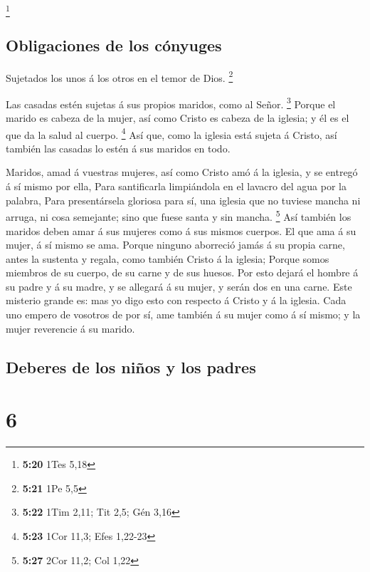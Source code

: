 \footnote{\textbf{5:20} 1Tes 5,18}

\hypertarget{obligaciones-de-los-cuxf3nyuges}{%
\subsection{Obligaciones de los
cónyuges}\label{obligaciones-de-los-cuxf3nyuges}}

 Sujetados los unos á los otros en el temor de Dios.
\footnote{\textbf{5:21} 1Pe 5,5}

 Las casadas estén sujetas á sus propios maridos, como al
Señor. \footnote{\textbf{5:22} 1Tim 2,11; Tit 2,5; Gén 3,16}
 Porque el marido es cabeza de la mujer, así como Cristo es
cabeza de la iglesia; y él es el que da la salud al cuerpo. \footnote{\textbf{5:23}
  1Cor 11,3; Efes 1,22-23}  Así que, como la iglesia está
sujeta á Cristo, así también las casadas lo estén á sus maridos en todo.

 Maridos, amad á vuestras mujeres, así como Cristo amó á la
iglesia, y se entregó á sí mismo por ella,  Para
santificarla limpiándola en el lavacro del agua por la palabra,
 Para presentársela gloriosa para sí, una iglesia que no
tuviese mancha ni arruga, ni cosa semejante; sino que fuese santa y sin
mancha. \footnote{\textbf{5:27} 2Cor 11,2; Col 1,22}  Así
también los maridos deben amar á sus mujeres como á sus mismos cuerpos.
El que ama á su mujer, á sí mismo se ama.  Porque ninguno
aborreció jamás á su propia carne, antes la sustenta y regala, como
también Cristo á la iglesia;  Porque somos miembros de su
cuerpo, de su carne y de sus huesos.  Por esto dejará el
hombre á su padre y á su madre, y se allegará á su mujer, y serán dos en
una carne.  Este misterio grande es: mas yo digo esto con
respecto á Cristo y á la iglesia.  Cada uno empero de
vosotros de por sí, ame también á su mujer como á sí mismo; y la mujer
reverencie á su marido.

\hypertarget{deberes-de-los-niuxf1os-y-los-padres}{%
\subsection{Deberes de los niños y los
padres}\label{deberes-de-los-niuxf1os-y-los-padres}}

\hypertarget{section-5}{%
\section{6}\label{section-5}}

